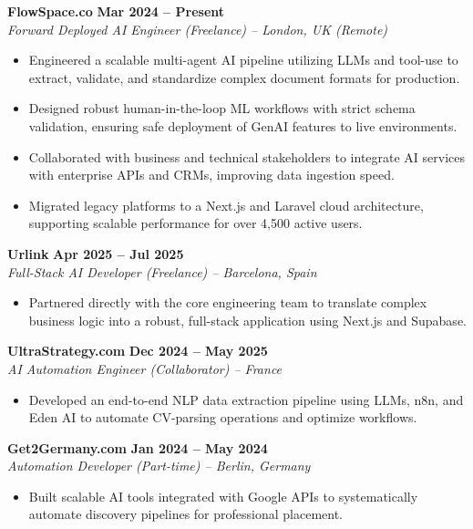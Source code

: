 \documentclass[10pt,a4paper]{article}
\begin{document}
\noindent\textbf{FlowSpace.co} \hfill \textbf{Mar 2024 -- Present} \\
\textit{Forward Deployed AI Engineer (Freelance) -- London, UK (Remote)}
\begin{itemize}[leftmargin=*, noitemsep]
\item Engineered a scalable multi-agent AI pipeline utilizing LLMs and tool-use to extract, validate, and standardize complex document formats for production.
\item Designed robust human-in-the-loop ML workflows with strict schema validation, ensuring safe deployment of GenAI features to live environments.
\item Collaborated with business and technical stakeholders to integrate AI services with enterprise APIs and CRMs, improving data ingestion speed.
\item Migrated legacy platforms to a Next.js and Laravel cloud architecture, supporting scalable performance for over 4,500 active users.
\end{itemize}
\vspace{0.5em}

\noindent\textbf{Urlink} \hfill \textbf{Apr 2025 -- Jul 2025} \\
\textit{Full-Stack AI Developer (Freelance) -- Barcelona, Spain}
\begin{itemize}[leftmargin=*, noitemsep]
\item Partnered directly with the core engineering team to translate complex business logic into a robust, full-stack application using Next.js and Supabase.
\end{itemize}
\vspace{0.5em}

\noindent\textbf{UltraStrategy.com} \hfill \textbf{Dec 2024 -- May 2025} \\
\textit{AI Automation Engineer (Collaborator) -- France}
\begin{itemize}[leftmargin=*, noitemsep]
\item Developed an end-to-end NLP data extraction pipeline using LLMs, n8n, and Eden AI to automate CV-parsing operations and optimize workflows.
\end{itemize}
\vspace{0.5em}

\noindent\textbf{Get2Germany.com} \hfill \textbf{Jan 2024 -- May 2024} \\
\textit{Automation Developer (Part-time) -- Berlin, Germany}
\begin{itemize}[leftmargin=*, noitemsep]
\item Built scalable AI tools integrated with Google APIs to systematically automate discovery pipelines for professional placement.
\end{itemize}
\end{document}
